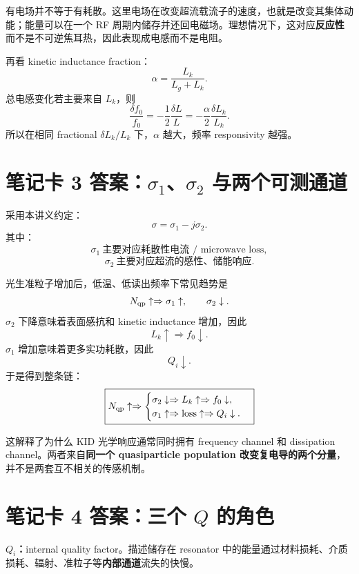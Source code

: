 \documentclass[11pt,a4paper,openany]{ctexrep}
\begin{document}
\begin{answerbox}[title=为什么这不是“电阻”？]
有电场并不等于有耗散。这里电场在改变超流载流子的速度，也就是改变其集体动能；能量可以在一个 RF 周期内储存并还回电磁场。理想情况下，这对应\textbf{反应性}而不是不可逆焦耳热，因此表现成电感而不是电阻。
\end{answerbox}

再看 kinetic inductance fraction：
\[
\alpha=\frac{L_k}{L_g+L_k}.
\]
总电感变化若主要来自 $L_k$，则
\[
\frac{\delta f_0}{f_0}
=-\frac12\frac{\delta L}{L}
=-\frac{\alpha}{2}\frac{\delta L_k}{L_k}.
\]
所以在相同 fractional $\delta L_k/L_k$ 下，$\alpha$ 越大，频率 responsivity 越强。

\section{笔记卡 3 答案：$\sigma_1$、$\sigma_2$ 与两个可测通道}

采用本讲义约定：
\[
\sigma=\sigma_1-j\sigma_2.
\]
其中：
\[
\boxed{\sigma_1\ \text{主要对应耗散性电流 / microwave loss}},
\]
\[
\boxed{\sigma_2\ \text{主要对应超流的感性、储能响应}}.
\]

光生准粒子增加后，低温、低读出频率下常见趋势是
\[
N_{\rm qp}\uparrow
\Rightarrow
\sigma_1\uparrow,
\qquad
\sigma_2\downarrow.
\]
$\sigma_2$ 下降意味着表面感抗和 kinetic inductance 增加，因此
\[
L_k\uparrow\Rightarrow f_0\downarrow.
\]
$\sigma_1$ 增加意味着更多实功耗散，因此
\[
Q_i\downarrow.
\]
于是得到整条链：
\[
\boxed{
N_{\rm qp}\uparrow
\Rightarrow
\begin{cases}
\sigma_2\downarrow\Rightarrow L_k\uparrow\Rightarrow f_0\downarrow,\\
\sigma_1\uparrow\Rightarrow \text{loss}\uparrow\Rightarrow Q_i\downarrow.
\end{cases}}
\]

\begin{answerbox}[title=工程意义]
这解释了为什么 KID 光学响应通常同时拥有 frequency channel 和 dissipation channel。两者来自\textbf{同一个 quasiparticle population 改变复电导的两个分量}，并不是两套互不相关的传感机制。
\end{answerbox}

\section{笔记卡 4 答案：三个 $Q$ 的角色}

\textbf{$Q_i$：}internal quality factor。描述储存在 resonator 中的能量通过材料损耗、介质损耗、辐射、准粒子等\textbf{内部通道}流失的快慢。
\end{document}
